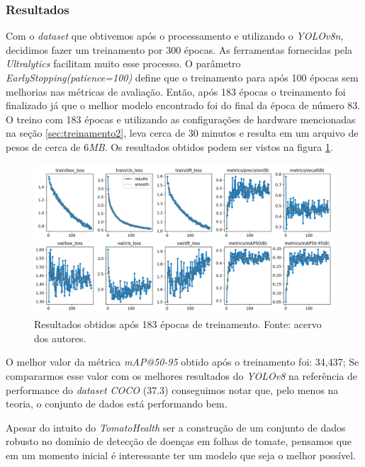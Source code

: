 \subsubsection{Resultados}
\label{sec:resultados}
Com o \emph{dataset} que obtivemos após o processamento e utilizando o \emph{YOLOv8n}, decidimos fazer um treinamento por 300 épocas. As ferramentas fornecidas pela \emph{Ultralytics} facilitam muito esse processo. O parâmetro \emph{EarlyStopping(patience=100)} define que o treinamento para após 100 épocas sem melhorias nas métricas de avaliação. Então, após 183 épocas o treinamento foi finalizado já que o melhor modelo encontrado foi do final da época de número 83. O treino com 183 épocas e utilizando as configurações de hardware mencionadas na seção \ref{sec:treinamento2}, leva cerca de 30 minutos e resulta em um arquivo de pesos de cerca de 6\emph{MB}. Os resultados obtidos podem ser vistos na figura \ref{fig:resultados-treinamento}.

\begin{figure}[htb!]
    \centering
    \includegraphics[width=1\linewidth]{images/results.png}
    \caption{Resultados obtidos após 183 épocas de treinamento. Fonte: acervo dos autores.}
    \label{fig:resultados-treinamento}
\end{figure}

O melhor valor da métrica \emph{mAP@50-95} obtido após o treinamento foi: 34,437; Se compararmos esse valor com os melhores resultados do \emph{YOLOv8} na referência de performance do \emph{dataset COCO} (37.3) conseguimos notar que, pelo menos na teoria, o conjunto de dados está performando bem.

Apesar do intuito do \emph{TomatoHealth} ser a construção de um conjunto de dados robusto no domínio de detecção de doenças em folhas de tomate, pensamos que em um momento inicial é interessante ter um modelo que seja o melhor possível. 

